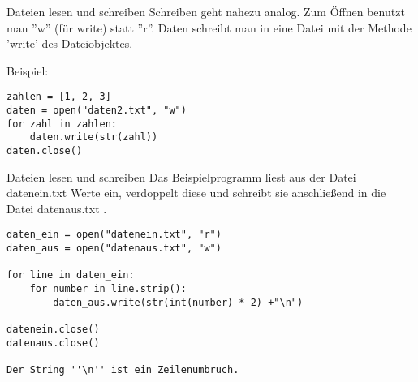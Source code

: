 \begin{frame}[fragile]{Dateien lesen und schreiben}
Schreiben geht nahezu analog. Zum Öffnen benutzt man ''w'' (für write) statt ''r''. Daten schreibt man in eine Datei mit der Methode 'write' des Dateiobjektes.

Beispiel:
\begin{lstlisting}
zahlen = [1, 2, 3]
daten = open("daten2.txt", "w")
for zahl in zahlen:
	daten.write(str(zahl))
daten.close()
\end{lstlisting}
\end{frame}


\begin{frame}[fragile]{Dateien lesen und schreiben}
Das Beispielprogramm liest aus der Datei datenein.txt Werte ein, verdoppelt diese und schreibt sie anschließend in die Datei datenaus.txt .


\begin{lstlisting}
daten_ein = open("datenein.txt", "r")
daten_aus = open("datenaus.txt", "w")

for line in daten_ein:
	for number in line.strip():
		daten_aus.write(str(int(number) * 2) +"\n")

datenein.close()
datenaus.close()

Der String ''\n'' ist ein Zeilenumbruch.
\end{lstlisting}
\end{frame}